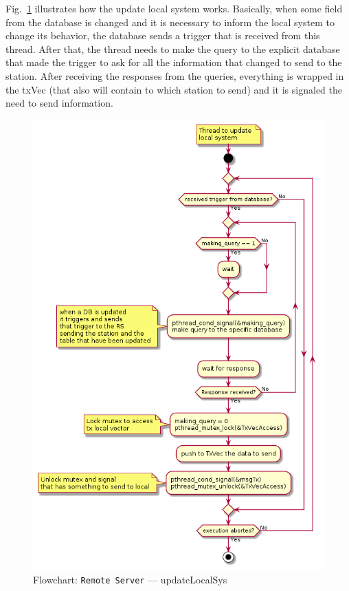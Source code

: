 Fig.~\ref{fig:flow-rs-update-local-sys} illustrates how the update local system works.
Basically, when some field from the database is changed and it is necessary to inform the local system to change its behavior, the database sends a trigger that is received from this thread. After that, the thread needs to make the query to the explicit database that made the trigger to ask for all the information that changed to send to the station.
After receiving the responses from the queries, everything is wrapped in the txVec (that also will contain to which station to send) and it is signaled the need to send information.
%
\begin{figure}[htb!]
\centering
    \includegraphics[width=0.6\columnwidth]{./img/flow-rs-updt-local-sys.png}
  \caption{Flowchart: \texttt{Remote Server} --- updateLocalSys}%
\label{fig:flow-rs-update-local-sys}
\end{figure}


